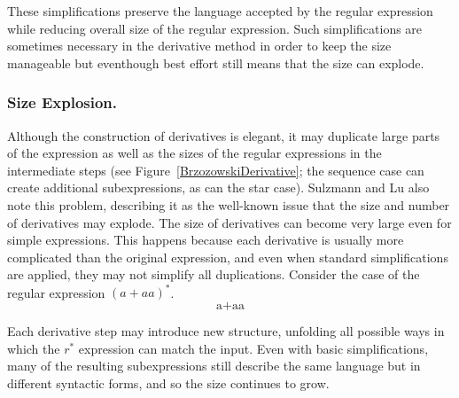 \documentclass[12pt]{article}
\begin{document}
These simplifications preserve the language accepted by the regular expression
while reducing overall size of the regular expression. Such simplifications are
sometimes necessary in the derivative method in order to keep the size
manageable but eventhough best effort still means that the size can explode.

\FloatBarrier
\subsubsection{Size Explosion.}  

Although the construction of derivatives is elegant, it may
duplicate large parts of the expression as well as the sizes of the regular
expressions in the intermediate steps (see Figure~\ref{BrzozowskiDerivative}; 
the sequence case can create additional subexpressions, as can the star case).
Sulzmann and Lu \cite{Sulzmann2014} also note this problem, describing it as the 
well-known issue that the size and number of derivatives may explode.
The size of derivatives can become very large even for simple expressions. 
This happens because each derivative is usually more complicated than the
original expression, and even when standard simplifications are applied,
they may not simplify all duplications. Consider the case of the regular expression
$(a+aa)^*$.
\[ \text{a+aa} \]

Each derivative step may introduce new structure, unfolding all
possible ways in which the $r^*$ expression can match the input. Even with
basic simplifications, many of the resulting subexpressions still describe the
same language but in different syntactic forms, and so the size continues to
grow.
\end{document}
